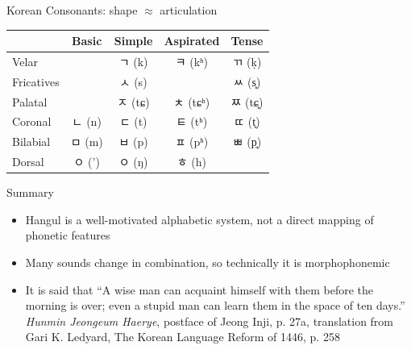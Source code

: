 \documentclass[xetex]{beamer}
\newcommand{\IPA}[1]{{\silipa\selectfont #1}}
\begin{document}
\begin{frame}{Korean Consonants:  shape $\approx$ articulation}

  \begin{center}
    \begin{tabular}{lcccc}
        & \textbf{Basic} & \textbf{Simple} & \textbf{Aspirated} & \textbf{Tense} \\
        \hline
        Velar & & \textkorean{ㄱ} (\IPA{k}) & \textkorean{ㅋ} (\IPA{kʰ}) & \textkorean{ㄲ} (\IPA{ḳ}) \\
        Fricatives & & \textkorean{ㅅ} (\IPA{s}) & & \textkorean{ㅆ} (\IPA{s͈}) \\
        Palatal &   & \textkorean{ㅈ} (\IPA{tɕ}) & \textkorean{ㅊ} (\IPA{tɕʰ}) & \textkorean{ㅉ} (\IPA{tɕ͈}) \\
        Coronal & \textkorean{ㄴ}  (\IPA{n})& \textkorean{ㄷ} (\IPA{t}) & \textkorean{ㅌ} (\IPA{tʰ}) & \textkorean{ㄸ} (\IPA{t͈}) \\
      Bilabial & \textkorean{ㅁ}  (\IPA{m})& \textkorean{ㅂ} (\IPA{p}) & \textkorean{ㅍ} (\IPA{pʰ}) & \textkorean{ㅃ} (\IPA{p͈}) \\
      \hline
      Dorsal & \textkorean{ㅇ} (\IPA{'}) & \textkorean{ㅇ} (\IPA{ŋ}) &  \textkorean{ㅎ} (\IPA{h}) \\
    \end{tabular}
  \end{center}

\end{frame}


\begin{frame}{Summary}
  \begin{itemize}
  \item Hangul is a well-motivated alphabetic system, not a direct mapping of phonetic features
  \item Many sounds change in combination, so technically it is morphophonemic
  \item It is said that ``A wise man can acquaint himself with them before the morning is over; even a stupid man can learn them in the space of ten days.''
\\ \textit{Hunmin Jeongeum Haerye}, postface of Jeong Inji, p. 27a, translation from Gari K. Ledyard, The Korean Language Reform of 1446, p. 258
  \end{itemize}
  
\end{frame}
\end{document}
